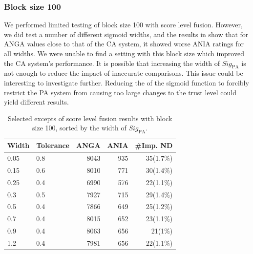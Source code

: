 \subsubsection{Block size 100}
We performed limited testing of block size 100 with score level fusion.
However, we did test a number of different sigmoid widths, and the results in  show that for ANGA values close to that of the CA system, it showed worse ANIA ratings for all widths.
We were unable to find a setting with this block size which improved the CA system's performance.
It is possible that increasing the width of $\textit{Sig}_{\text{PA}}$ is not enough to reduce the impact of inaccurate comparisons.
This issue could be interesting to investigate further.
Reducing the  of the sigmoid function to forcibly restrict the PA system from causing too large changes to the trust level could yield different results.

\begin{table}[htbp]
\centering
\begin{tabular}{llrrr}
\hline
\textbf{Width} & \textbf{Tolerance} & \textbf{ANGA} & \textbf{ANIA} & \textbf{\#Imp. ND} \\ \hline
0.05           & 0.8                & 8043          & 935           & 35(1.7\%)          \\ %
0.15           & 0.6                & 8010          & 771           & 30(1.4\%)          \\ %
0.25           & 0.4                & 6990          & 576           & 22(1.1\%)          \\ %
0.3            & 0.5                & 7927          & 715           & 29(1.4\%)          \\ %
0.5            & 0.4                & 7866          & 649           & 25(1.2\%)          \\ %
0.7            & 0.4                & 8015          & 652           & 23(1.1\%)          \\ %
0.9            & 0.4                & 8063          & 656           & 21(1\%)            \\ %
1.2            & 0.4                & 7981          & 656           & 22(1.1\%)          \\ %
\end{tabular}
\caption{Selected excepts of score level fusion results with block size 100, sorted by the width of $\textit{Sig}_{\text{PA}}$.}
\label{tab:analysis-score-level-BL100}
\end{table}


